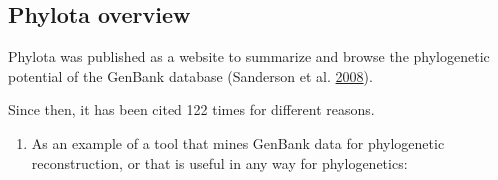 \documentclass[]{article}
\providecommand{\tightlist}{%
  \setlength{\itemsep}{0pt}\setlength{\parskip}{0pt}}
\begin{document}
\hypertarget{phylota-overview}{%
\subsection{Phylota overview}\label{phylota-overview}}

Phylota was published as a website to summarize and browse the phylogenetic potential of the GenBank
database (Sanderson et al. \protect\hyperlink{ref-sanderson2008phylota}{2008}).

Since then, it has been cited 122 times for different reasons.

\begin{enumerate}
\def\labelenumi{\arabic{enumi}.}
\tightlist
\item
  As an example of a tool that mines GenBank data for phylogenetic reconstruction,
  or that is useful in any way for phylogenetics:


\end{enumerate}
\end{document}
